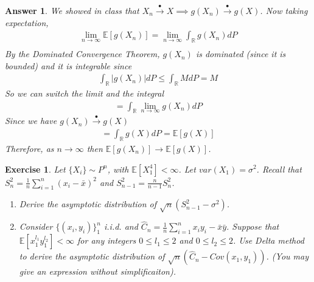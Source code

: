 \documentclass[12pt]{article}
\theoremstyle{colon}
\newtheorem{exercise}{Exercise}
\newtheorem*{answer}{Answer}
\begin{document}
\begin{answer}
  We showed in class that $X_n \xrightarrow{\bullet} X \implies g(X_n) \xrightarrow{\bullet} g(X)$. Now taking expectation,
  \begin{gather*}
    \lim_{n \rightarrow \infty} \mathbb{E}[g(X_n)] = \lim_{n \rightarrow \infty} \int_\mathbb{R} g(X_n) dP \\
  \end{gather*}
  By the Dominated Convergence Theorem, $g(X_n)$ is dominated (since it is bounded) and it is integrable since
  \begin{gather*}
    \int_\mathbb{R} \lvert g(X_n) \rvert dP \leq \int_\mathbb{R} M dP = M
  \end{gather*}
  So we can switch the limit and the integral
  \begin{gather*}
    = \int_\mathbb{R} \lim_{n \rightarrow \infty} g(X_n) dP
  \end{gather*}
  Since we have $g(X_n) \xrightarrow{\bullet} g(X)$
  \begin{gather*}
    = \int_\mathbb{R} g(X) dP = \mathbb{E}[g(X)]
  \end{gather*}
  Therefore, as $n \rightarrow \infty$ then $\mathbb{E}[g(X_n)] \rightarrow \mathbb{E}[g(X)]$.
\end{answer}

\clearpage

\begin{exercise}
  Let $\{ X_i \} \sim P^n$, with $\mathbb{E}[X_1^4] < \infty$. Let $var(X_1) = \sigma^2$. Recall that $S_n^2 = \frac{1}{n} \sum_{i=1}^n (x_i - \bar{x})^2$ and $S_{n-1}^2 = \frac{n}{n-1} S_n^2$.
  \begin{enumerate}[label=\arabic*)]
    \item Derive the asymptotic distribution of $\sqrt{n}(S_{n-1}^2 - \sigma^2)$.
    \item Consider $\{ (x_i, y_i) \}_1^n$ i.i.d. and $\widehat{C}_n = \frac{1}{n} \sum_{i=1}^n x_i y_i - \bar{x} \bar{y}$. Suppose that $\mathbb{E}[x_1^{l_1} y_1^{l_2}] < \infty$ for any integers $0 \leq l_1 \leq 2$ and $0 \leq l_2 \leq 2$. Use Delta method to derive the asymptotic distribution of $\sqrt{n}(\widehat{C}_n - Cov(x_1,y_1))$. (You may give an expression without simplificaiton).
  \end{enumerate}
\end{exercise}
\end{document}

